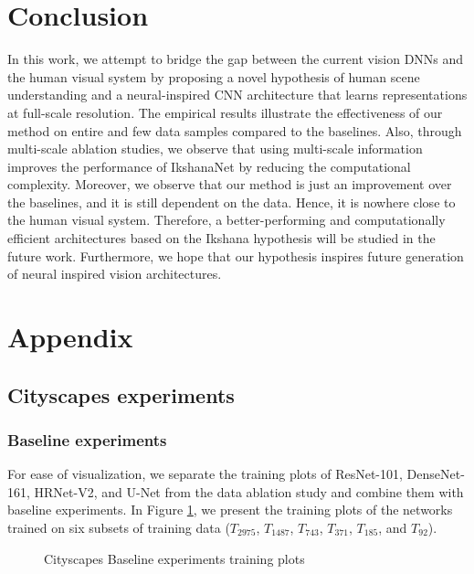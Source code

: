 \documentclass{article}
\begin{document}
\section{Conclusion}
\label{6}
In this work, we attempt to bridge the gap between the current vision DNNs and the human visual system by proposing a novel hypothesis of human scene understanding and a  neural-inspired CNN architecture that learns representations at full-scale resolution.\newline
The empirical results illustrate the effectiveness of our method on entire and few data samples compared to the baselines. Also, through multi-scale ablation studies, we observe that using multi-scale information improves the performance of IkshanaNet by reducing the computational complexity.\newline
Moreover, we observe that our method is just an improvement over the baselines, and it is still dependent on the data. Hence, it is nowhere close to the human visual system. Therefore, a better-performing and computationally efficient architectures based on the Ikshana hypothesis will be studied in the future work.\newline
Furthermore, we hope that our hypothesis inspires future generation of neural inspired vision architectures. 

 




\newpage

\appendix

\section{Appendix}
\subsection{Cityscapes experiments}
\subsubsection{Baseline experiments}
For ease of visualization, we separate the training plots of ResNet-101, DenseNet-161,  HRNet-V2, and U-Net from the data ablation study and combine them with baseline experiments. In Figure \ref{C1}, we present the training plots of the networks trained on six subsets of training data ($T_{2975}$, $T_{1487}$, $T_{743}$, $T_{371}$, $T_{185}$, and $T_{92}$).

\begin{figure}[ht]
\centering     {}
\caption{Cityscapes Baseline experiments training plots}
\label{C1}
\end{figure}
\end{document}
